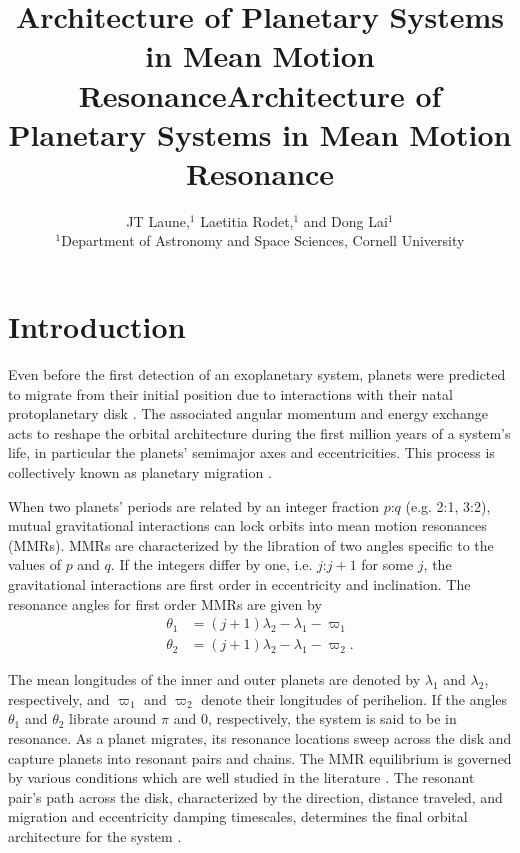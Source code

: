 \documentclass{mnras}
\title[MMR Architecture]{Architecture of Planetary Systems in Mean Motion Resonance}
\author[Laune et al.]{
JT Laune,$^{1}$
Laetitia Rodet,$^{1}$
and Dong Lai$^{1}$
\\
$^{1}$Department of Astronomy and Space Sciences, Cornell University\\}
\date{}
\title{Architecture of Planetary Systems in Mean Motion Resonance}
\begin{document}
\maketitle
\maketitle

\section{Introduction}
\label{sec:org79f21bb}

Even before the first detection of an exoplanetary system, planets
were predicted to migrate from their initial position due to
interactions with their natal protoplanetary disk
\cite{lin79_tidal_torques_accret_discs_binar,goldreich_excitation_1979,goldreich_disk-satellite_1980-1}.
The associated angular momentum and energy exchange acts to reshape
the orbital architecture during the first million years of a system's
life, in particular the planets' semimajor axes and eccentricities.
This process is collectively known as planetary migration
\cite{nelson_planetary_2018}.

When two planets' periods are related by an integer fraction \(p\):\(q\)
(e.g. 2:1, 3:2), mutual gravitational interactions can lock orbits
into mean motion resonances (MMRs).  MMRs are characterized by the
libration of two angles specific to the values of \(p\) and \(q\).  If the
integers differ by one, i.e. \(j\):\(j+1\) for some \(j\), the gravitational
interactions are first order in eccentricity and inclination.  The
resonance angles for first order MMRs are given by
\begin{align}
\label{circangles1}
 \theta_1 &= (j+1)\lambda_2 - \lambda_1 - \varpi_1 \\
\label{circangles2}
 \theta_2 &= (j+1)\lambda_2 - \lambda_1 - \varpi_2.
\end{align}

\noindent The mean longitudes of the inner and outer planets
are denoted by \(\lambda_1\) and \(\lambda_2\), respectively, and
\(\varpi_1\) and \(\varpi_2\) denote their longitudes of perihelion.  If
the angles \(\theta_1\) and \(\theta_2\) librate around \(\pi\) and \(0\),
respectively, the system is said to be in resonance.  As a planet
migrates, its resonance locations sweep across the disk and capture
planets into resonant pairs and chains.  The MMR equilibrium is
governed by various conditions which are well studied in the
literature
\cite{henrard_second_1983,deck_migration_2015,goldreich_overstable_2014,xu_migration_2018,henrard_second_1983}.
The resonant pair's path across the disk, characterized by the
direction, distance traveled, and migration and eccentricity damping
timescales, determines the final orbital architecture for the system
\cite{cresswell_evolution_2006,cresswell_three-dimensional_2008}.
\end{document}
